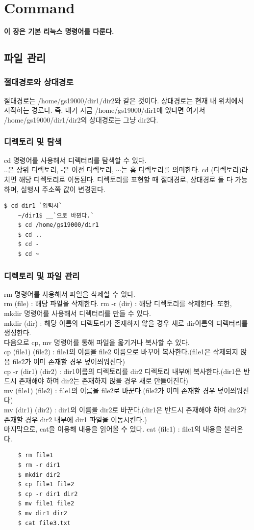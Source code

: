 
\graphicspath{{./chap3/images/}} 
\chapter{Command}
\textbf{이 장은 기본 리눅스 명령어를 다룬다.}
\section{파일 관리}
\subsection{절대경로와 상대경로}
절대경로는 /home/gs19000/dir1/dir2와 같은 것이다. 상대경로는 현재 내 위치에서 시작하는 경로다. 즉, 내가 지금 /home/gs19000/dir1에 있다면 여기서 /home/gs19000/dir1/dir2의 상대경로는 그냥 dir2다.
\subsection{디렉토리 및 탐색}
cd 명령어를 사용해서 디렉터리를 탐색할 수 있다. \\ ..은 상위 디렉토리, -은 이전 디렉토리, $\sim$는 홈 디렉토리를 의미한다.
cd (디렉토리)라 치면 해당 디렉토리로 이동된다. 디렉토리를 표현할 때 절대경로, 상대경로 둘 다 가능하며, 실행시 주소쪽 값이 변경된다.
\begin{lstlisting}[escapechar=\`]
	$ cd dir1 `입력시`
    ~/dir1$ __`으로 바뀐다.`
    $ cd /home/gs19000/dir1 
    $ cd ..
    $ cd -
    $ cd ~
\end{lstlisting}
\subsection{디렉토리 및 파일 관리}
rm 명령어를 사용해서 파일을 삭제할 수 있다.\\
rm (file) : 해당 파일을 삭제한다. rm -r (dir) : 해당 디렉토리를 삭제한다.
또한, mkdir 명령어를 사용해서 디렉터리를 만들 수 있다.\\
mkdir (dir) : 해당 이름의 디렉토리가 존재하지 않을 경우 새로 dir이름의 디렉터리를 생성한다.\\


다음으로 cp, mv 명령어를 통해 파일을 옯기거나 복사할 수 있다.\\
cp (file1) (file2) : file1의 이름을 file2 이름으로 바꾸어 복사한다.(file1은 삭제되지 않음 file2가 이미 존재할 경우 덮어씌워진다)\\
cp -r (dir1) (dir2) : dir1이름의 디렉토리를 dir2 디렉토리 내부에 복사한다.(dir1은 반드시 존재해야 하며 dir2는 존재하지 않을 경우 새로 만들어진다)\\
mv (file1) (file2) : file1의 이름을 file2로 바꾼다.(file2가 이미 존재할 경우 덮어씌워진다)\\
mv (dir1) (dir2) : dir1의 이름을 dir2로 바꾼다.(dir1은 반드시 존재해야 하며 dir2가 존재할 경우 dir2 내부에 dir1 파일을 이동시킨다.)\\
마지막으로, cat을 이용해 내용을 읽어올 수 있다. cat (file1) : file1의 내용을 불러온다.
    \begin{lstlisting}
    $ rm file1
    $ rm -r dir1
    $ mkdir dir2
    $ cp file1 file2
    $ cp -r dir1 dir2
    $ mv file1 file2
    $ mv dir1 dir2
    $ cat file3.txt
    \end{lstlisting}
